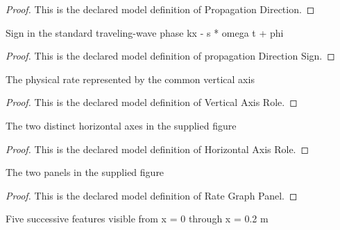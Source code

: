 \begin{proof}
  This is the declared model definition of Propagation Direction.
\end{proof}
\begin{definition}
  \label{def:physics:phyx-mini-0293:phyxminiproblems-problemphyxmini0293-propagationdirectionsign}
  Sign in the standard traveling-wave phase kx - s * omega t + phi
\end{definition}
\begin{proof}
  This is the declared model definition of propagation Direction Sign.
\end{proof}
\begin{definition}
  \label{def:physics:phyx-mini-0293:phyxminiproblems-problemphyxmini0293-verticalaxisrole}
  The physical rate represented by the common vertical axis
\end{definition}
\begin{proof}
  This is the declared model definition of Vertical Axis Role.
\end{proof}
\begin{definition}
  \label{def:physics:phyx-mini-0293:phyxminiproblems-problemphyxmini0293-horizontalaxisrole}
  The two distinct horizontal axes in the supplied figure
\end{definition}
\begin{proof}
  This is the declared model definition of Horizontal Axis Role.
\end{proof}
\begin{definition}
  \label{def:physics:phyx-mini-0293:phyxminiproblems-problemphyxmini0293-rategraphpanel}
  The two panels in the supplied figure
\end{definition}
\begin{proof}
  This is the declared model definition of Rate Graph Panel.
\end{proof}
\begin{definition}
  \label{def:physics:phyx-mini-0293:phyxminiproblems-problemphyxmini0293-spatialgraphfeature}
  Five successive features visible from x = 0 through x = 0.2 m
\end{definition}
